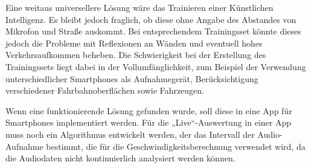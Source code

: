 Eine weitaus universellere Lösung wäre das Trainieren einer Künstlichen Intelligenz. Es bleibt jedoch fraglich, ob diese ohne Angabe des Abstandes von Mikrofon und Straße auskommt. Bei entsprechendem Trainingsset könnte dieses jedoch die Probleme mit Reflexionen an Wänden und eventuell hohes Verkehrsaufkommen beheben. Die Schwierigkeit bei der Erstellung des Trainingssets liegt dabei in der Vollumfänglichkeit, zum Beispiel der Verwendung unterschiedlicher Smartphones als Aufnahmegerät, Berücksichtigung verschiedener Fahrbahnoberflächen sowie Fahrzeugen.

Wenn eine funktionierende Lösung gefunden wurde, soll diese in eine App für Smartphones implementiert werden. Für die „Live“-Auswertung in einer App muss noch ein Algorithmus entwickelt werden, der das Intervall der Audio-Aufnahme bestimmt, die für die Geschwindigkeitsberechnung verwendet wird, da die Audiodaten nicht kontinuierlich analysiert werden können.
